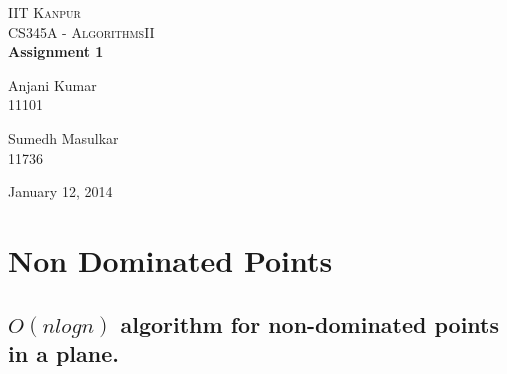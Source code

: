 \documentclass[pdftex,a4paper,12pt]{report}
\begin{document}
\begin{titlepage}
\begin{center}

\textsc{\LARGE IIT Kanpur}\\[1.5cm]

\textsc{\Large CS345A - AlgorithmsII}\\[0.5cm]

{ \huge \bfseries Assignment 1 \\[0.4cm] }


\begin{minipage}{0.4\textwidth}
\begin{flushleft} \large
Anjani Kumar\\
11101
\end{flushleft}
\end{minipage}
\begin{minipage}{0.4\textwidth}
\begin{flushright} \large
Sumedh Masulkar\\
11736
\end{flushright}
\end{minipage}

\vfill

{\large January 12, 2014}

\end{center}
\end{titlepage}

\tableofcontents
\newpage
\section {Non Dominated Points}
\subsection {\textbf{$O(n logn)$} algorithm for non-dominated points in a plane.}
\end{document}
